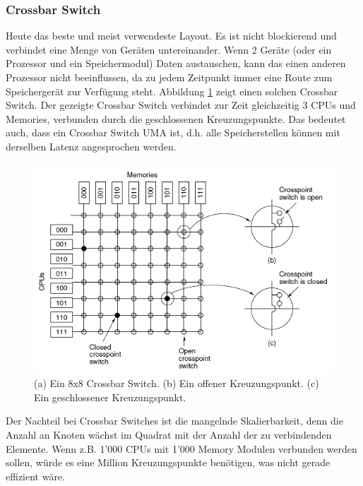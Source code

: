 \subsubsection{Crossbar Switch}
Heute das beste und meist verwendeste Layout. Es ist nicht blockierend und verbindet eine Menge von Geräten untereinander. Wenn 2 Geräte (oder ein Prozessor und ein Speichermodul) Daten austauschen, kann das einen anderen Prozessor nicht beeinflussen, da zu jedem Zeitpunkt immer eine Route zum Speichergerät zur Verfügung steht. Abbildung \ref{fig:crossbar_switch} zeigt einen solchen Crossbar Switch. Der gezeigte Crossbar Switch verbindet zur Zeit gleichzeitig 3 CPUs und Memories, verbunden durch die geschlossenen Kreuzungspunkte. Das bedeutet auch, dass ein Crossbar Switch UMA ist, d.h. alle Speicherstellen können mit derselben Latenz angesprochen werden.
\begin{figure}
\centering
\includegraphics[width=0.7\linewidth]{fig/crossbar_switch}
\caption{(a) Ein 8x8 Crossbar Switch. (b) Ein offener Kreuzungspunkt. (c) Ein geschlossener Kreuzungspunkt.}
\label{fig:crossbar_switch}
\end{figure}

Der Nachteil bei Crossbar Switches ist die mangelnde Skalierbarkeit, denn die Anzahl an Knoten wächst im Quadrat mit der Anzahl der zu verbindenden Elemente. Wenn z.B. 1'000 CPUs mit 1'000 Memory Modulen verbunden werden sollen, würde es eine Million Kreuzungspunkte benötigen, was nicht gerade effizient wäre.

